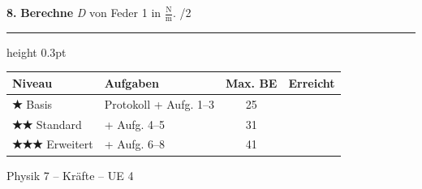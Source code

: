 \documentclass[10pt,a4paper]{article}
\newcommand{\punkte}[1]{\hfill\textcolor{grau}{\small/#1}}
\newcommand{\stern}[1]{\textcolor{physik}{\textbf{#1}}}
\newcommand{\fv}[1]{\textit{#1}}
\newcommand{\op}[1]{\textbf{#1}}
\begin{document}
\textbf{8.} \op{Berechne} \fv{D} von Feder 1 in $\frac{\text{N}}{\text{m}}$. \; \punkte{2}

\vspace{10mm}

\vfill

\hrule height 0.3pt
\vspace{2mm}

{\small
\begin{tabular}{|l|l|c|c|}
\hline
\rowcolor{hellgrau}
\textbf{Niveau} & \textbf{Aufgaben} & \textbf{Max. BE} & \textbf{Erreicht} \\
\hline
\stern{★} Basis & Protokoll + Aufg. 1–3 & 25 & \\
\hline
\stern{★★} Standard & + Aufg. 4–5 & 31 & \\
\hline
\stern{★★★} Erweitert & + Aufg. 6–8 & 41 & \\
\hline
\end{tabular}
\hfill
\textcolor{grau}{\footnotesize Physik 7 – Kräfte – UE 4}
}
\end{document}
